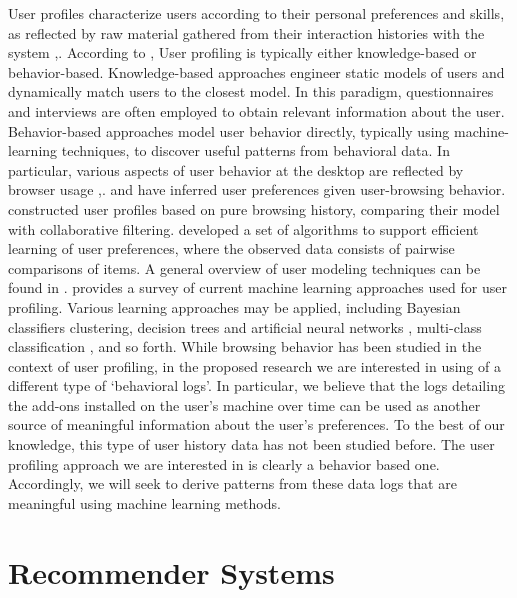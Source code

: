\documentclass[11pt,oneside]{book}
\let\Oldsection\section
\renewcommand{\section}{\FloatBarrier\Oldsection}
\begin{document}
User profiles characterize users according to their personal
preferences and skills, as reflected by raw material gathered from
their interaction histories with the system \citep{koch2001software},\citep{gauch2007user}. According to \citep{gauch2007user}, User profiling is typically either knowledge-based or
behavior-based. Knowledge-based approaches engineer static models of
users and dynamically match users to the closest model. In this
paradigm, questionnaires and interviews are often employed to obtain
relevant information about the user. Behavior-based approaches model
user behavior directly, typically using machine-learning techniques,
to discover useful patterns from behavioral data. In particular,
various aspects of user behavior at the desktop are reflected by
browser usage \citep{benevenuto2009characterizing},\citep{bilenko11}. \citep{lieberman1995letizia} and \citep{joachims97} have inferred user preferences given user-browsing behavior. \citep{sugiyama2004adaptive} constructed user profiles based on pure browsing history,
comparing their model with collaborative filtering.  \citep{lu2011learning} developed a set of algorithms to support efficient
learning of user preferences, where the observed data consists of
pairwise comparisons of items.  A general overview of user modeling
techniques can be found in \citep{leontiadis2012don}. \citep{sebastiani02} \citep{sebastiani03} provides a survey of current machine learning
approaches used for user profiling.  Various learning approaches may
be applied, including Bayesian classifiers clustering, decision trees
and artificial neural networks \citep{pazzani97}, multi-class classification \cite{bauer2014analyzing},
and so forth.  While browsing behavior has been studied in the context
of user profiling, in the proposed research we are interested in using
of a different type of `behavioral logs'. In particular, we believe
that the logs detailing the add-ons installed on the user's machine
over time can be used as another source of meaningful information
about the user's preferences. To the best of our knowledge, this type
of user history data has not been studied before. The user profiling
approach we are interested in is clearly a behavior based
one. Accordingly, we will seek to derive patterns from these data logs
that are meaningful using machine learning methods.

\section{Recommender Systems}
\end{document}
